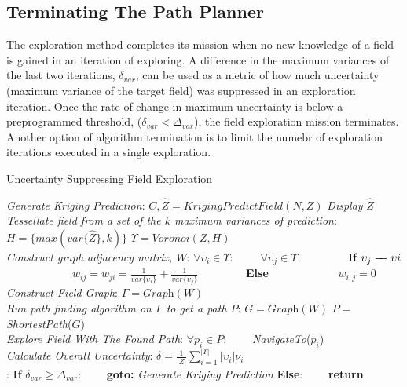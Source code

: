 \subsection{Terminating The Path Planner}
The exploration method completes its mission when no new knowledge of a field is gained in an iteration of exploring. A difference in the maximum variances of the last two iterations, $\delta_{var}$, can be used as a metric of how much uncertainty (maximum variance of the target field) was suppressed in an exploration iteration. Once the rate of change in maximum uncertainty is below a preprogrammed threshold, ($\delta_{var} < \Delta_{var}$), the field exploration mission terminates. Another option of algorithm termination is to limit the numebr of exploration iterations executed in a single exploration.

\begin{algorithm}[thpb!]
\caption{Uncertainty Suppressing Field Exploration}\label{alg:uncert}
\begin{algorithmic}[2]
    \BState \emph{Generate Kriging Prediction}:
    \State $C, \hat{Z} = \textit{KrigingPredictField}(N,Z)$
    \State \textit{Display} $\hat{Z}$\\
    \BState \emph{Tessellate field from a set of the $k$ maximum variances of prediction}:
    \State $H = \{max(var\{\hat{Z}\}, k)\}$
    \State $\Upsilon = \textit{Voronoi}(Z, H)$\\
    \BState \emph{Construct graph adjacency matrix, $W$}:
    \State $\forall \upsilon_i \in \Upsilon:$
    \State \ \ \ \ $\forall \upsilon_j \in \Upsilon$:
    \State \ \ \ \ \ \ \ \ \textbf{If} {$\upsilon_j \edge \upsilon{i}$}
    \State \ \ \ \ \ \ \ \ \ \ \ \  $w_{ij} = w_{ji} = \frac{1}{var\{\upsilon_i\}} + \frac{1}{var\{\upsilon_j\}}$
    \State \ \ \ \ \ \ \ \ \textbf{Else}
    \State \ \ \ \ \ \ \ \ \ \ \ \  $w_{i,j} = 0$\\
    \BState \emph{Construct Field Graph}:
    \State $\Gamma = \textit{Graph}(W)$\\
    \BState \emph{Run path finding algorithm on $\Gamma$ to get a path $P$}:
    \State $G = \textit{Graph}(W)$
    \State $P = $ \textit{ShortestPath}($G$)\\
    \BState \emph{Explore Field With The Found Path}:
    \State $\forall p_i \in P$:
    \State \ \ \ \ \textit{NavigateTo}($p_i$)\\
    \BState \emph{Calculate Overall Uncertainty}:
    \State $\delta = \frac{1}{|Z|} \sum_{i = 1}^{|\Upsilon|} |\upsilon_i| \nu_i$\\
    :
    \State \textbf{If} $\delta_{var} \geq \Delta_{var}$:
    \State \ \ \ \ \textbf{goto:} \textit{Generate Kriging Prediction}
    \State \textbf{Else}:
    \State \ \ \ \ \textbf{return}
\EndProcedure
\end{algorithmic}
\end{algorithm}
